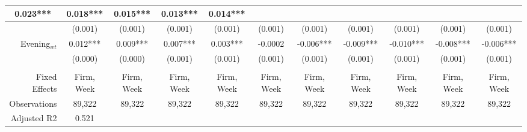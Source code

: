 \begin{table}
{\begin{tabular}{rcccccccccc}
  \multicolumn{1}{c|}{0.023***} &
  \multicolumn{1}{c|}{0.018***} &
  \multicolumn{1}{c|}{0.015***} &
  \multicolumn{1}{c|}{0.013***} &
  \multicolumn{1}{c|}{0.014***} \\ \hline
\multicolumn{1}{|r|}{} &
  \multicolumn{1}{c|}{(0.001)} &
  \multicolumn{1}{c|}{(0.001)} &
  \multicolumn{1}{c|}{(0.001)} &
  \multicolumn{1}{c|}{(0.001)} &
  \multicolumn{1}{c|}{(0.001)} &
  \multicolumn{1}{c|}{(0.001)} &
  \multicolumn{1}{c|}{(0.001)} &
  \multicolumn{1}{c|}{(0.001)} &
  \multicolumn{1}{c|}{(0.001)} &
  \multicolumn{1}{c|}{(0.001)} \\ \hline
\multicolumn{1}{|r|}{Evening$_{wt}$} &
  \multicolumn{1}{c|}{0.012***} &
  \multicolumn{1}{c|}{0.009***} &
  \multicolumn{1}{c|}{0.007***} &
  \multicolumn{1}{c|}{0.003***} &
  \multicolumn{1}{c|}{-0.0002} &
  \multicolumn{1}{c|}{-0.006***} &
  \multicolumn{1}{c|}{-0.009***} &
  \multicolumn{1}{c|}{-0.010***} &
  \multicolumn{1}{c|}{-0.008***} &
  \multicolumn{1}{c|}{-0.006***} \\ \hline
\multicolumn{1}{|r|}{} &
  \multicolumn{1}{c|}{(0.000)} &
  \multicolumn{1}{c|}{(0.000)} &
  \multicolumn{1}{c|}{(0.001)} &
  \multicolumn{1}{c|}{(0.001)} &
  \multicolumn{1}{c|}{(0.001)} &
  \multicolumn{1}{c|}{(0.001)} &
  \multicolumn{1}{c|}{(0.001)} &
  \multicolumn{1}{c|}{(0.001)} &
  \multicolumn{1}{c|}{(0.001)} &
  \multicolumn{1}{c|}{(0.001)} \\ \hline
 &
   &
   &
   &
  \multicolumn{1}{l}{} &
  \multicolumn{1}{l}{} &
  \multicolumn{1}{l}{} &
  \multicolumn{1}{l}{} &
  \multicolumn{1}{l}{} &
  \multicolumn{1}{l}{} &
  \multicolumn{1}{l}{} \\ \hline
\multicolumn{1}{|r|}{Fixed Effects} &
  \multicolumn{1}{c|}{Firm, Week} &
  \multicolumn{1}{c|}{Firm, Week} &
  \multicolumn{1}{c|}{Firm, Week} &
  \multicolumn{1}{c|}{Firm, Week} &
  \multicolumn{1}{c|}{Firm, Week} &
  \multicolumn{1}{c|}{Firm, Week} &
  \multicolumn{1}{c|}{Firm, Week} &
  \multicolumn{1}{c|}{Firm, Week} &
  \multicolumn{1}{c|}{Firm, Week} &
  \multicolumn{1}{c|}{Firm, Week} \\ \hline
\multicolumn{1}{|r|}{Observations} &
  \multicolumn{1}{c|}{89,322} &
  \multicolumn{1}{c|}{89,322} &
  \multicolumn{1}{c|}{89,322} &
  \multicolumn{1}{c|}{89,322} &
  \multicolumn{1}{c|}{89,322} &
  \multicolumn{1}{c|}{89,322} &
  \multicolumn{1}{c|}{89,322} &
  \multicolumn{1}{c|}{89,322} &
  \multicolumn{1}{c|}{89,322} &
  \multicolumn{1}{c|}{89,322} \\ \hline
\multicolumn{1}{|r|}{Adjusted R2} &
  \multicolumn{1}{c|}{0.521} &

\end{tabular}}
\end{table}
